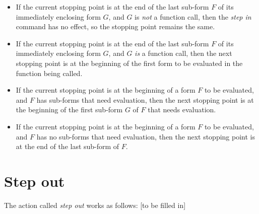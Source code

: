\begin{itemize}
\item If the current stopping point is at the end of the last sub-form
  $F$ of its immediately enclosing form $G$, and $G$ is \emph{not} a
  function call, then the \emph{step in} command has no effect, so the
  stopping point remains the same.
\item If the current stopping point is at the end of the last sub-form
  $F$ of its immediately enclosing form $G$, and $G$ \emph{is} a
  function call, then the next stopping point is at the beginning of
  the first form to be evaluated in the function being called.
\item If the current stopping point is at the beginning of a form $F$
  to be evaluated, and $F$ has sub-forms that need evaluation, then
  the next stopping point is at the beginning of the first sub-form
  $G$ of $F$ that needs evaluation.
\item If the current stopping point is at the beginning of a form $F$
  to be evaluated, and $F$ has no sub-forms that need evaluation, then
  the next stopping point is at the end of the last sub-form of $F$.
\end{itemize}

\section{Step out}

The action called \emph{step out} works as follows:
[to be filled in]

